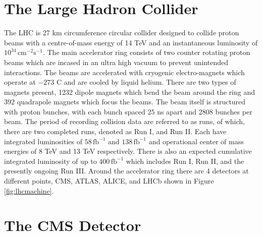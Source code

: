 \section{The Large Hadron Collider}
The LHC is 27 km circumference circular collider designed to collide proton beams with a centre-of-mass energy of 14 TeV and an instantaneous luminosity of $10^{34} \, \text{cm}^{-2}\text{s}^{-1}$\cite{Evans:2008zzb}. The main accelerator ring consists of two counter rotating proton beams which are incased in an ultra high vacuum to prevent unintended interactions. The beams are accelerated with cryogenic electro-magnets which operate at $-273$ \degree C and are cooled by liquid helium. There are two types of magnets present, 1232 dipole magnets which bend the beam around the ring and 392 quadrapole magnets which focus the beams.  The beam itself is structured with proton bunches, with each bunch spaced $25$ ns apart and 2808 bunches per beam. The period of recording collision data are referred to as runs, of which, there are two completed runs, denoted as Run I, and Run II. Each have integrated luminosities of $58 \, \text{fb}^{-1}$ and $138\, \text{fb}^{-1}$ and operational center of mass energies of 8 TeV and 13 TeV respectively. There is also an expected cumulative integrated luminosity of up to $400 \,\text{fb}^{-1}$ which includes Run I, Run II, and the presently ongoing Run III. Around the accelerator ring there are 4 detectors at different points, CMS, ATLAS, ALICE, and LHCb shown in Figure \ref{fig:lhcmachine}.




\section{The CMS Detector}


